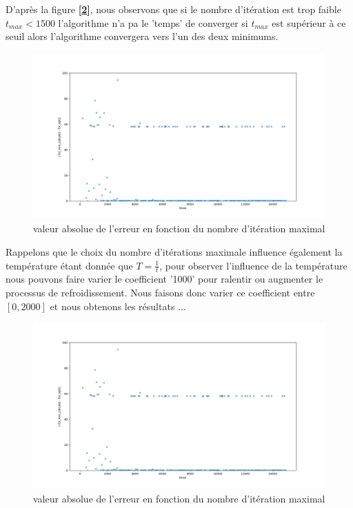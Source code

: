 \documentclass[12pt]{article}
\begin{document}
\begin{minipage}{0.5\textwidth}

D'après la figure \textbf{[\ref{Q1_T}]}, nous observons que si le nombre d'itération est trop faible $t_{max}<1500$ l'algorithme n'a pa le 'temps' de converger si $t_{max}$ est supérieur à ce seuil alors l'algorithme convergera vers l'un des deux minimums.
\end{minipage} \hfill
\begin{minipage}{0.45\textwidth}
\begin{figure}[H]
\includegraphics[width=1\textwidth]{Q1_T.png}
\caption{valeur absolue de l'erreur en fonction du nombre d'itération maximal}
\label{Q1_T}
\end{figure}
\end{minipage}



\begin{minipage}{0.5\textwidth}
Rappelons que le choix du nombre d'itérations maximale influence également la température étant donnée que $T=\frac{1}{t}$, pour observer l'influence de la température nous pouvons faire varier le coefficient  '1000' pour ralentir ou augmenter le processus de refroidissement. Nous faisons donc varier ce coefficient entre $[0,2000]$ et nous obtenons les résultats ...
\end{minipage} \hfill
\begin{minipage}{0.45\textwidth}
\begin{figure}[H]
\includegraphics[width=1\textwidth]{Q1_T.png}
\caption{valeur absolue de l'erreur en fonction du nombre d'itération maximal}
\label{Q1_T}
\end{figure}
\end{minipage}
\end{document}
